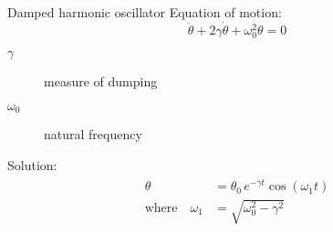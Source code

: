 \begin{frame}{Damped harmonic oscillator}
Equation of motion:
\begin{equation} \label{eq:motion-general}
	\ddot{\theta}+2 \gamma \dot{\theta} + \omega_0^2 \theta = 0
\end{equation}\begin{description}
\item[$\gamma$] measure of dumping
\item[$\omega_0$] natural frequency
\end{description}

\pause
Solution:
\begin{align}
	\begin{split}
	 \theta &= \theta_0 \, e^{-\gamma t} \cos(\omega_1 t) \\
	\text{where} \quad \omega_1 &=\sqrt{\omega_0^2-\gamma^2}
	\end{split}
\label{eq:motion-transient}
\end{align}
\end{frame}

